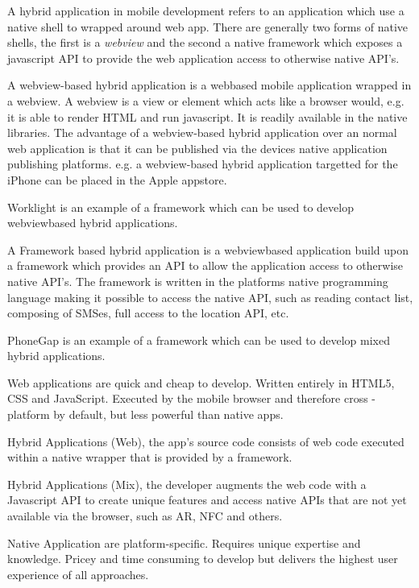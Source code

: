 
A hybrid application in mobile development refers to an application which use a native shell to wrapped around web app. There are generally two forms of native shells, the first is a \emph{webview} and the second a native framework which exposes a javascript API to provide the web application access to otherwise native API's.

A webview-based hybrid application is a webbased mobile application wrapped in a webview. A webview is a view or element which acts like a browser would, e.g. it is able to render HTML and run javascript.  It is readily available in the native libraries. The advantage of a webview-based hybrid application over an normal web application is that it can be published via the devices native application publishing platforms. e.g. a webview-based hybrid application targetted for the iPhone can be placed in the Apple appstore. 

Worklight is an example of a framework which can be used to develop webviewbased hybrid applications.

A Framework based hybrid application is a webviewbased application build upon a framework which provides an API to allow the application access to otherwise native API's. The framework is written in the platforms native programming language making it possible to access the native API, such as reading contact list, composing of SMSes, full access to the location API, etc.

PhoneGap is an example of a framework which can be used to develop mixed hybrid applications.

Web applications are quick and cheap to develop. Written entirely in HTML5, CSS and JavaScript. Executed by the mobile
browser and therefore cross - platform by default, but less powerful than native apps.
 
Hybrid Applications (Web), the app's source code consists of web code executed within a native wrapper that is provided by a framework.
 
Hybrid Applications (Mix), the developer augments the web code with a Javascript API to create unique features and
access native APIs that are not yet available via the browser, such as AR, NFC and others.
 
Native Application are platform-specific. Requires unique expertise and knowledge. Pricey and time consuming to develop but
 delivers the highest user experience of all approaches.

